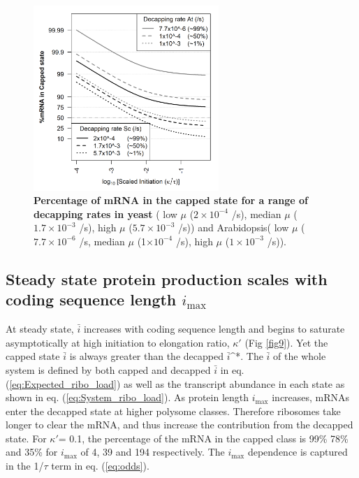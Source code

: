 \documentclass[10pt,letterpaper]{article}
\newcommand{\imax}{\ensuremath{{i_{\max}}}\xspace}
\newcommand{\MRL}{\ensuremath{\bar{i}}\xspace}
\begin{document}
\begin{figure}[!h]
  \begin{center}
    \includegraphics[width=70mm]{Images/2023-07-28_logodds.png}
    \caption{{\bf Percentage of mRNA in the capped state for a range of decapping rates in yeast} ( low $\mu$ ($2\times 10^{-4}$ /s), median $\mu$ ($1.7\times 10^{-3}$ /s), high $\mu$ ($5.7\times 10^{-3}$ /s)) and Arabidopsis( low $\mu$ ($7.7\times 10^{-6}$ /s, median $\mu$ (1$\times 10^{-4}$ /s), high $\mu$ ($1\times 10^{-3}$ /s)). }
    \label{fig8}
  \end{center}
\end{figure}

\subsection*{Steady state protein production scales with coding sequence length \imax}
At steady state, \MRL increases with coding sequence length and begins to saturate asymptotically at high initiation to elongation ratio, $\kappa'$ (Fig \ref{fig9}).
Yet the capped state \MRL is always greater than the decapped \MRL^*.
The \MRL of the whole system is defined by both capped and decapped \MRL in eq. (\ref{eq:Expected_ribo_load}) as well as the transcript abundance in each state as shown in eq. (\ref{eq:System_ribo_load}).
As protein length \imax increases, mRNAs enter the decapped state at higher polysome classes. 
Therefore ribosomes take longer  to clear the mRNA, and thus increase the contribution from the decapped state. 
For $\kappa'$= 0.1, the percentage of the mRNA in the capped class is  99\% 78\%  and 35\% for \imax of 4, 39 and 194 respectively.
The \imax dependence is captured in the 1/$\tau$ term in eq. (\ref{eq:odds}).
\end{document}
